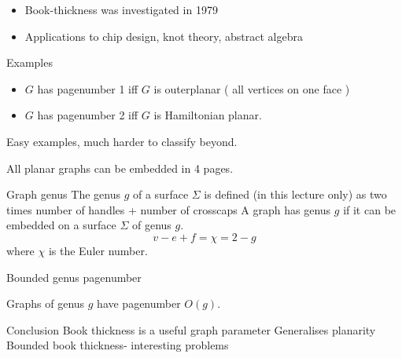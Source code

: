 \documentclass[]{beamer}
\begin{document}
\begin{frame}
	\begin{itemize}
		\item Book-thickness was investigated in 1979
		\item Applications to chip design, knot theory, abstract algebra
	\end{itemize}
\end{frame}

\begin{frame}{Examples}
	\begin{itemize}
		\item $G$ has pagenumber 1 iff $G$ is outerplanar ( all vertices on one face )
		\item $G$ has pagenumber 2 iff $G$ is Hamiltonian planar.
	\end{itemize}
	Easy examples, much harder to classify beyond.
\end{frame}

\begin{frame}
	\begin{theorem}[Yannikakis] 
		All planar graphs can be embedded in 4 pages.
	\end{theorem}
\end{frame}

\begin{frame}{Graph genus}
	The genus $g$ of a surface $\Sigma$ is defined (in this lecture only) as two times number of handles + number of crosscaps
	A graph has genus $g$ if it can be embedded on a surface $\Sigma$ of genus $g$.
	\begin{equation}
		v - e + f = \chi = 2 - g
	\end{equation}
	where $\chi$ is the Euler number.
\end{frame}

\begin{frame}{Bounded genus pagenumber}
	\begin{theorem}
		Graphs of genus $g$ have pagenumber $O(g)$. 
	\end{theorem}
\end{frame}

\begin{frame}{Conclusion}
	Book thickness is a useful graph parameter
	Generalises planarity
	Bounded book thickness- interesting problems
\end{frame}

\end{document}
